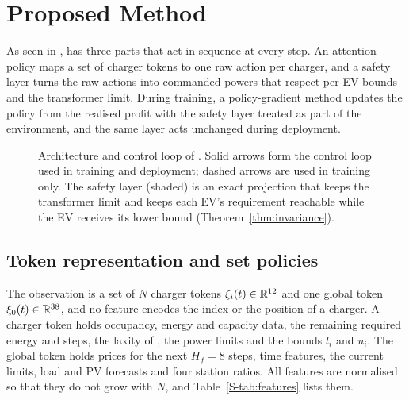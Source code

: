 \section{Proposed Method}\label{sec:method}

As seen in , \method{} has three parts that act in sequence at every step.
An attention policy maps a set of charger tokens to one raw action per charger, and a safety layer turns the raw actions into commanded powers that respect per-EV bounds and the transformer limit.
During training, a policy-gradient method updates the policy from the realised profit with the safety layer treated as part of the environment, and the same layer acts unchanged during deployment.

\begin{figure}[t]
\centering
{}
\caption{Architecture and control loop of \method{}. Solid arrows form the control loop used in training and deployment; dashed arrows are used in training only. The safety layer (shaded) is an exact projection that keeps the transformer limit and keeps each EV's requirement reachable while the EV receives its lower bound (Theorem~\ref{thm:invariance}).}
\label{fig:architecture}
\end{figure}

\subsection{Token representation and set policies}\label{sec:policy}

The observation is a set of $N$ charger tokens $\xi_i(t)\in\mathbb R^{12}$ and one global token $\xi_0(t)\in\mathbb R^{38}$, and no feature encodes the index or the position of a charger.
A charger token holds occupancy, energy and capacity data, the remaining required energy and steps, the laxity of , the power limits and the bounds $l_i$ and $u_i$.
The global token holds prices for the next $H_f=8$ steps, time features, the current limits, load and PV forecasts and four station ratios.
All features are normalised so that they do not grow with $N$, and Table~\ref{S-tab:features} lists them.

